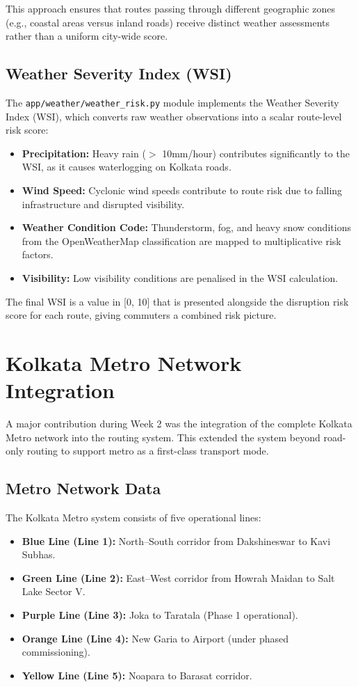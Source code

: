 \documentclass[12pt, a4paper]{report}
\begin{document}
This approach ensures that routes passing through different geographic zones (e.g., coastal areas versus inland roads) receive distinct weather assessments rather than a uniform city-wide score.

\subsection{Weather Severity Index (WSI)}

The \texttt{app/weather/weather\_risk.py} module implements the Weather Severity Index (WSI), which converts raw weather observations into a scalar route-level risk score:

\begin{itemize}
    \item \textbf{Precipitation:} Heavy rain ($>$ 10mm/hour) contributes significantly to the WSI, as it causes waterlogging on Kolkata roads.
    \item \textbf{Wind Speed:} Cyclonic wind speeds contribute to route risk due to falling infrastructure and disrupted visibility.
    \item \textbf{Weather Condition Code:} Thunderstorm, fog, and heavy snow conditions from the OpenWeatherMap classification are mapped to multiplicative risk factors.
    \item \textbf{Visibility:} Low visibility conditions are penalised in the WSI calculation.
\end{itemize}

The final WSI is a value in [0, 10] that is presented alongside the disruption risk score for each route, giving commuters a combined risk picture.

\section{Kolkata Metro Network Integration}

A major contribution during Week 2 was the integration of the complete Kolkata Metro network into the routing system. This extended the system beyond road-only routing to support metro as a first-class transport mode.

\subsection{Metro Network Data}

The Kolkata Metro system consists of five operational lines:

\begin{itemize}
    \item \textbf{Blue Line (Line 1):} North--South corridor from Dakshineswar to Kavi Subhas.
    \item \textbf{Green Line (Line 2):} East--West corridor from Howrah Maidan to Salt Lake Sector V.
    \item \textbf{Purple Line (Line 3):} Joka to Taratala (Phase 1 operational).
    \item \textbf{Orange Line (Line 4):} New Garia to Airport (under phased commissioning).
    \item \textbf{Yellow Line (Line 5):} Noapara to Barasat corridor.
\end{itemize}
\end{document}
